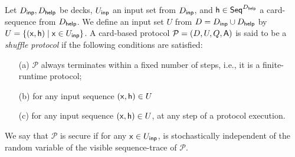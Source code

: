 \begin{definition}
Let $D_{\mathsf{inp}}, D_{\mathsf{help}}$ be decks, $U_{\mathsf{inp}}$ an input set from $D_{\mathsf{inp}}$, and $\mathsf{h} \in \mathsf{Seq}^{D_{\mathsf{help}}}$ a card-sequence from $D_{\mathsf{help}}$. 
We define an input set $U$ from $D = D_{\mathsf{inp}} \cup D_{\mathsf{help}}$ by $U = \{(\mathsf{x}, \mathsf{h}) \mid \mathsf{x} \in U_{\mathsf{inp}}\}$. 
A card-based protocol $\mathcal{P}=(D, U,Q,\mathsf{A})$ is said to be a \textit{shuffle protocol} if the following conditions are satisfied:
\begin{enumerate}
\item[(a)] $\mathcal{P}$ always terminates within a fixed number of steps, i.e., it is a finite-runtime protocol;
\item[(b)] for any input sequence $(\mathsf{x}, \mathsf{h}) \in U$ 
\item[(c)] for any input sequence $(\mathsf{x}, \mathsf{h})\in U$,  at any step of a protocol execution.
\end{enumerate}
We say that $\mathcal{P}$ is secure if for any $\mathsf{x} \in U_{\mathsf{inp}}$,  is stochastically independent of the random variable of the visible sequence-trace of $\mathcal{P}$. 
\end{definition}
